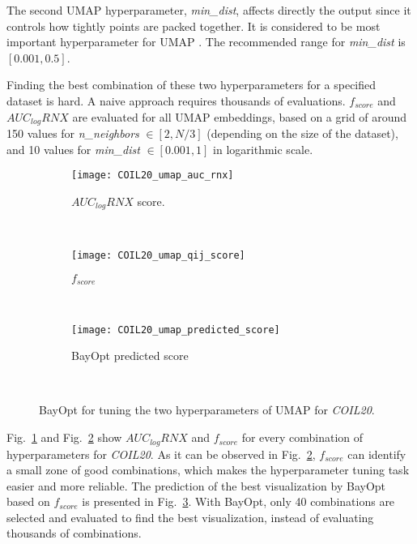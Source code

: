 The second UMAP hyperparameter, \emph{min\_dist}, affects directly the output since it controls how tightly points are packed together. It is considered to be most important hyperparameter for UMAP \cite{mcinnes2018umap}.
The recommended range for \emph{min\_dist} is $[0.001, 0.5]$.

Finding the best combination of these two hyperparameters for a specified dataset is hard.
A naive approach requires thousands of evaluations.
$f_{score}$ and $AUC_{log}RNX$ are evaluated for all UMAP embeddings, based on a grid of around 150 values for \emph{n\_neighbors} $\in [2, N/3]$ (depending on the size of the dataset), and 10 values for \emph{min\_dist} $\in [0.001, 1]$ in logarithmic scale.

\begin{figure}%
    \begin{subfigure}[b]{.76\linewidth}
        \centering
        \texttt{[image: COIL20\_umap\_auc\_rnx]}
        \caption{$AUC_{log}RNX$ score.}
        \label{fig:bo:umap:COIL20:rnx}
    \end{subfigure}
    ~
    \begin{subfigure}[b]{.76\linewidth}
        \centering
        \texttt{[image: COIL20\_umap\_qij\_score]}
        \caption{$f_{score}$}
        \label{fig:bo:umap:COIL20:fscore}
    \end{subfigure}
    ~
    \begin{subfigure}[b]{.98\linewidth}
        \centering
        \texttt{[image: COIL20\_umap\_predicted\_score]}
        \caption{BayOpt predicted score}
        \label{fig:bo:umap:COIL20:prediction}
    \end{subfigure}
    ~
    \caption{BayOpt for tuning the two hyperparameters of UMAP for \emph{COIL20}.}
    \label{fig:bo:umap:COIL20}
\end{figure}

Fig.~\ref{fig:bo:umap:COIL20:rnx} and Fig.~\ref{fig:bo:umap:COIL20:fscore} show $AUC_{log}RNX$ and $f_{score}$ for every combination of hyperparameters for \emph{COIL20}.
As it can be observed in Fig.~\ref{fig:bo:umap:COIL20:fscore}, $f_{score}$ can identify a small zone of good combinations, which makes the hyperparameter tuning task easier and more reliable. The prediction of the best visualization by BayOpt based on $f_{score}$ is presented in Fig.~\ref{fig:bo:umap:COIL20:prediction}.
With BayOpt, only 40 combinations are selected and evaluated to find the best visualization, instead of evaluating thousands of combinations.


